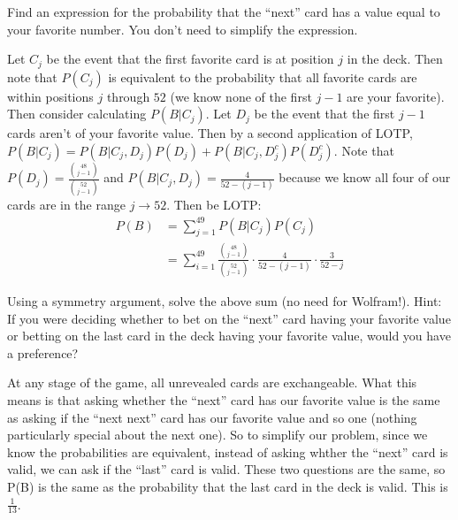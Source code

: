 \documentclass[11pt]{article}
\begin{document}
\begin{exercise}
Find an expression for the probability that the ``next'' card has a value equal to your favorite number. You don't need to simplify the expression.
\end{exercise}
\begin{solution}
Let $C_j$ be the event that the first favorite card is at position $j$ in the deck. Then note that $P(C_j)$ is equivalent to the probability that all favorite cards are within positions $j$ through $52$ (we know none of the first $j-1$ are your favorite). Then consider calculating $P(B|C_j)$. Let $D_j$ be the event that the first $j-1$ cards aren't of your favorite value. Then by a second application of LOTP, $P(B|C_j) = P(B|C_j,D_j)P(D_j) + P(B|C_j,D_j^c)P(D_j^c)$. Note that $P(D_j) = \frac{{48 \choose j-1}}{{52 \choose j-1}}$ and $P(B|C_j,D_j) = \frac{4}{52-(j-1)}$ because we know all four of our cards are in the range $j \to 52$. Then be LOTP:
\begin{align*}
P(B) &= \sum_{j=1}^{49} P(B | C_j)P(C_j) \\
&=\sum_{i=1}^{49} \frac{{48 \choose j-1}}{{52 \choose j - 1}} \cdot \frac{4}{52 - (j-1)}\cdot \frac{3}{52 - j}
\end{align*}
\end{solution}

\begin{exercise}
Using a symmetry argument, solve the above sum (no need for Wolfram!).
Hint: If you were deciding whether to bet on the ``next'' card having your favorite value or betting on the last card in the deck having your favorite value, would you have a preference?
\end{exercise}
\begin{solution}
At any stage of the game, all unrevealed cards are exchangeable. What this means is that asking whether the ``next'' card has our favorite value is the same as asking if the ``next next'' card has our favorite value and so one (nothing particularly special about the next one). So to simplify our problem, since we know the probabilities are equivalent, instead of asking whther the ``next'' card is valid, we can ask if the ``last'' card is valid. These two questions are the same, so P(B) is the same as the probability that the last card in the deck is valid. This is $\frac{1}{13}$.
\end{solution}
\end{document}
